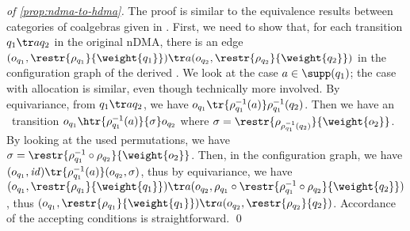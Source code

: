 \begin{proof}[of \cref{prop:ndma-to-hdma}]
 The proof is similar to the equivalence results between categories of coalgebras given in \cite{CianciaM10}. First, we need to show that, for each transition $q_1 \tr a q_2$ in the original nDMA, there is an edge $(o_{q_1},\restr{\rho_{q_1}}{\weight{q_1}}) \tr a (o_{q_2},\restr{\rho_{q_2}}{\weight{q_2}})$ in the configuration graph of the derived \hdma. We look at the case $a \in \supp(q_1)$; the case with allocation is similar, even though technically more involved. By equivariance, from $q_1 \tr a q_2$, we have $o_{q_1} \tr{\rho^{-1}_{q_1} (a)} \rho^{-1}_{q_1}(q_2)$. Then we have an \hdma\ transition $o_{q_1} \htr{\rho^{-1}_{q_1}(a)}{\sigma} o_{q_2}$ where $\sigma = \restr{\rho_{\rho^{-1}_{q_1}(q_2)}}{\weight{o_2}}$. 
 By looking at the used permutations, we have $\sigma = \restr{\rho^{-1}_{q_1} \circ \rho_{q_2}}{\weight{o_2}}$. 
 Then, in the configuration graph, we have $(o_{q_1},\mathit{id}) \tr{\rho^{-1}_{q_1}(a)} (o_{q_2},\sigma)$, thus by equivariance, we have 
 $(o_{q_1},\restr{\rho_{q_1}}{\weight{q_1}}) \tr a (o_{q_2},\rho_{q_1} \circ 
 \restr {\rho^{-1}_{q_1} \circ \rho_{q_2}}{\weight{q_2}})$, 
 thus $(o_{q_1},\restr{\rho_{q_1}}{\weight{q_1}}) \tr a (o_{q_2},\restr{\rho_{q_2}}{q_2})$. Accordance of the accepting conditions is straightforward.
 \qed
\end{proof}


